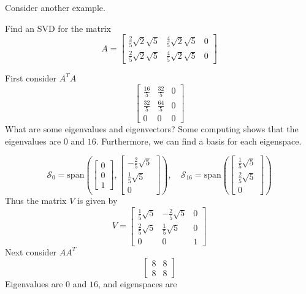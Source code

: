 \documentclass{ximera}
\begin{document}
Consider another example.
 
\begin{example}\label{SVDanother2x3}
Find an SVD for the matrix
\begin{equation*}
A= \left[
\begin{array}{ccc}
\frac{2}{5}\sqrt{2}\sqrt{5} & \frac{4}{5}\sqrt{2}\sqrt{5} & 0 \\
\frac{2}{5}\sqrt{2}\sqrt{5} & \frac{4}{5}\sqrt{2}\sqrt{5} & 0
\end{array}
\right]
\end{equation*}
 
\begin{explanation}
First consider $A^TA$
\begin{equation*}
\left[
\begin{array}{ccc}
\frac{16}{5} & \frac{32}{5} & 0 \\
\frac{32}{5} & \frac{64}{5} & 0 \\
0 & 0 & 0
\end{array}
\right]
\end{equation*}
What are some eigenvalues and eigenvectors? Some computing shows that the eigenvalues are $0$ and $16$.  Furthermore, we can find a basis for each eigenspace.
 
\begin{equation*}
\mathcal{S}_0=\mbox{span}\left( \left[
\begin{array}{c}
0 \\
0 \\
1
\end{array}
\right] ,\left[ 
\begin{array}{c}
-\frac{2}{5}\sqrt{5} \\
\frac{1}{5}\sqrt{5} \\
0
\end{array}
\right] \right),
\quad\mathcal{S}_{16}=\mbox{span}\left( \left[ 
\begin{array}{c}
\frac{1}{5}\sqrt{5} \\
\frac{2}{5}\sqrt{5} \\
0
\end{array}
\right] \right)
\end{equation*}
Thus the matrix $V$ is given by
\begin{equation*}
V=\left[
\begin{array}{ccc}
\frac{1}{5}\sqrt{5} & -\frac{2}{5}\sqrt{5} & 0 \\
\frac{2}{5}\sqrt{5} & \frac{1}{5}\sqrt{5} & 0 \\
0 & 0 & 1
\end{array}
\right]
\end{equation*}
Next consider $AA^T$
\begin{equation*}
\left[
\begin{array}{cc}
8 & 8 \\
8 & 8
\end{array}
\right]
\end{equation*}
Eigenvalues are $0$ and $16$, and eigenspaces are
 

\end{explanation}
\end{example}
\end{document}
